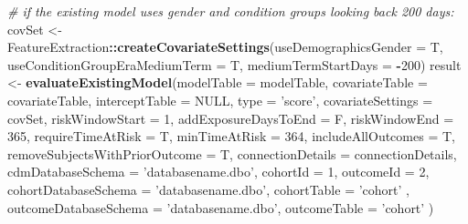 \documentclass[]{article}
\newenvironment{Shaded}{\begin{snugshade}}{\end{snugshade}}
\newcommand{\KeywordTok}[1]{\textcolor[rgb]{0.13,0.29,0.53}{\textbf{#1}}}
\newcommand{\DataTypeTok}[1]{\textcolor[rgb]{0.13,0.29,0.53}{#1}}
\newcommand{\DecValTok}[1]{\textcolor[rgb]{0.00,0.00,0.81}{#1}}
\newcommand{\StringTok}[1]{\textcolor[rgb]{0.31,0.60,0.02}{#1}}
\newcommand{\CommentTok}[1]{\textcolor[rgb]{0.56,0.35,0.01}{\textit{#1}}}
\newcommand{\OtherTok}[1]{\textcolor[rgb]{0.56,0.35,0.01}{#1}}
\newcommand{\OperatorTok}[1]{\textcolor[rgb]{0.81,0.36,0.00}{\textbf{#1}}}
\newcommand{\NormalTok}[1]{#1}
\begin{document}
\begin{Shaded}
\begin{Highlighting}[]
\CommentTok{# if the existing model uses gender and condition groups looking back 200 days:}
\NormalTok{covSet <-}\StringTok{ }\NormalTok{FeatureExtraction}\OperatorTok{::}\KeywordTok{createCovariateSettings}\NormalTok{(}\DataTypeTok{useDemographicsGender =}\NormalTok{ T,}
                                                     \DataTypeTok{useConditionGroupEraMediumTerm =}\NormalTok{ T, }
                                                     \DataTypeTok{mediumTermStartDays =} \OperatorTok{-}\DecValTok{200}\NormalTok{)}
\NormalTok{result <-}\StringTok{ }\KeywordTok{evaluateExistingModel}\NormalTok{(}\DataTypeTok{modelTable =}\NormalTok{ modelTable,}
                                \DataTypeTok{covariateTable =}\NormalTok{ covariateTable,}
                                \DataTypeTok{interceptTable =} \OtherTok{NULL}\NormalTok{,}
                                \DataTypeTok{type =} \StringTok{'score'}\NormalTok{, }
                                \DataTypeTok{covariateSettings =}\NormalTok{  covSet,}
                                \DataTypeTok{riskWindowStart =} \DecValTok{1}\NormalTok{, }
                                \DataTypeTok{addExposureDaysToEnd =}\NormalTok{ F, }
                                \DataTypeTok{riskWindowEnd =} \DecValTok{365}\NormalTok{, }
                                \DataTypeTok{requireTimeAtRisk =}\NormalTok{ T, }
                                \DataTypeTok{minTimeAtRisk =} \DecValTok{364}\NormalTok{, }
                                \DataTypeTok{includeAllOutcomes =}\NormalTok{ T, }
                                \DataTypeTok{removeSubjectsWithPriorOutcome =}\NormalTok{ T, }
                                \DataTypeTok{connectionDetails =}\NormalTok{ connectionDetails, }
                                \DataTypeTok{cdmDatabaseSchema =} \StringTok{'databasename.dbo'}\NormalTok{,}
                                \DataTypeTok{cohortId =} \DecValTok{1}\NormalTok{,}
                                \DataTypeTok{outcomeId =} \DecValTok{2}\NormalTok{, }
                                \DataTypeTok{cohortDatabaseSchema =} \StringTok{'databasename.dbo'}\NormalTok{, }
                                \DataTypeTok{cohortTable =}  \StringTok{'cohort'}\NormalTok{ , }
                                \DataTypeTok{outcomeDatabaseSchema =} \StringTok{'databasename.dbo'}\NormalTok{, }
                                \DataTypeTok{outcomeTable =} \StringTok{'cohort'}
\NormalTok{                      )}
\end{Highlighting}
\end{Shaded}
\end{document}
